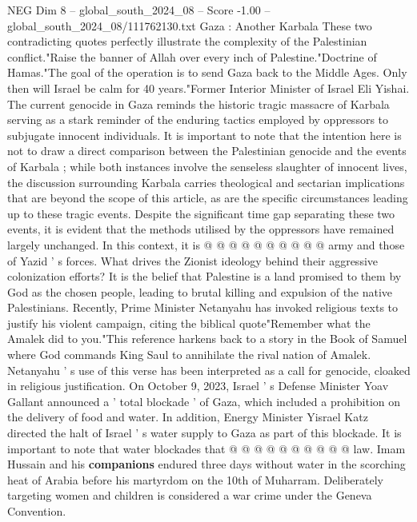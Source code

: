 \begin{textsample}{NEG Dim 8 – global\_south\_2024\_08 – Score -1.00 – global\_south\_2024\_08/111762130.txt}  \label{ex:f8_neg_281}
Gaza : Another Karbala These two contradicting quotes perfectly illustrate the complexity of the Palestinian conflict."Raise the banner of Allah over every inch of Palestine."Doctrine of Hamas."The goal of the operation is to send Gaza back to the Middle Ages.
Only then will Israel be calm for 40 years."Former Interior Minister of Israel Eli Yishai.
The current genocide in Gaza reminds the historic tragic massacre of Karbala serving as a stark reminder of the enduring tactics employed by oppressors to subjugate innocent individuals.
It is important to note that the intention here is not to draw a direct comparison between the Palestinian genocide and the events of Karbala ; while both instances involve the senseless slaughter of innocent lives, the discussion surrounding Karbala carries theological and sectarian implications that are beyond the scope of this article, as are the specific circumstances leading up to these tragic events.
Despite the significant time gap separating these two events, it is evident that the methods utilised by the oppressors have remained largely unchanged.
In this context, it is @ @ @ @ @ @ @ @ @ @ army and those of Yazid ' s forces.
What drives the Zionist ideology behind their aggressive colonization efforts?
It is the belief that Palestine is a land promised to them by God as the chosen people, leading to brutal killing and expulsion of the native Palestinians.
Recently, Prime Minister Netanyahu has invoked religious texts to justify his violent campaign, citing the biblical quote"Remember what the Amalek did to you."This reference harkens back to a story in the Book of Samuel where God commands King Saul to annihilate the rival nation of Amalek.
Netanyahu ' s use of this verse has been interpreted as a call for genocide, cloaked in religious justification.
On October 9, 2023, Israel ' s Defense Minister Yoav Gallant announced a ' total blockade ' of Gaza, which included a prohibition on the delivery of food and water.
In addition, Energy Minister Yisrael Katz directed the halt of Israel ' s water supply to Gaza as part of this blockade.
It is important to note that water blockades that @ @ @ @ @ @ @ @ @ @ law.
Imam Hussain and his \textbf{companions} endured three days without water in the scorching heat of Arabia before his martyrdom on the 10th of Muharram.
Deliberately targeting women and children is considered a war crime under the Geneva Convention.

\end{textsample}
